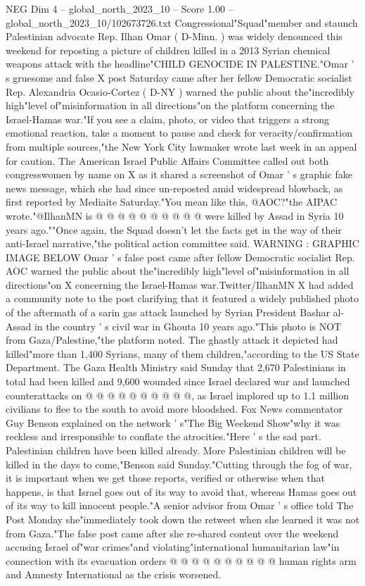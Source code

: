 \begin{textsample}{NEG Dim 4 – global\_north\_2023\_10 – Score 1.00 – global\_north\_2023\_10/102673726.txt}  \label{ex:f4_neg_012}
Congressional"Squad"member and staunch Palestinian advocate Rep.
Ilhan Omar ( D-Minn. ) was widely denounced this weekend for reposting a picture of children killed in a 2013 Syrian chemical weapons attack with the headline"CHILD GENOCIDE IN PALESTINE."Omar ' s gruesome and false X post Saturday came after her fellow Democratic socialist Rep.
Alexandria Ocasio-Cortez ( D-NY ) warned the public about the"incredibly high"level of"misinformation in all directions"on the platform concerning the Israel-Hamas war."If you see a claim, photo, or video that triggers a strong emotional reaction, take a moment to pause and check for veracity/confirmation from multiple sources,"the New York City lawmaker wrote last week in an appeal for caution.
The American Israel Public Affairs Committee called out both congresswomen by name on X as it shared a screenshot of Omar ' s graphic fake news message, which she had since un-reposted amid widespread blowback, as first reported by Mediaite Saturday."You mean like this, @AOC?"the AIPAC wrote."@IlhanMN is @ @ @ @ @ @ @ @ @ @ were killed by Assad in Syria 10 years ago.""Once again, the Squad doesn't let the facts get in the way of their anti-Israel narrative,"the political action committee said.
WARNING : GRAPHIC IMAGE BELOW Omar ' s false post came after fellow Democratic socialist Rep.
AOC warned the public about the"incredibly high"level of"misinformation in all directions"on X concerning the Israel-Hamas war.Twitter/IlhanMN X had added a community note to the post clarifying that it featured a widely published photo of the aftermath of a sarin gas attack launched by Syrian President Bashar al-Assad in the country ' s civil war in Ghouta 10 years ago."This photo is NOT from Gaza/Palestine,"the platform noted.
The ghastly attack it depicted had killed"more than 1,400 Syrians, many of them children,"according to the US State Department.
The Gaza Health Ministry said Sunday that 2,670 Palestinians in total had been killed and 9,600 wounded since Israel declared war and launched counterattacks on @ @ @ @ @ @ @ @ @ @, as Israel implored up to 1.1 million civilians to flee to the south to avoid more bloodshed.
Fox News commentator Guy Benson explained on the network ' s"The Big Weekend Show"why it was reckless and irresponsible to conflate the atrocities."Here ' s the sad part.
Palestinian children have been killed already.
More Palestinian children will be killed in the days to come,"Benson said Sunday."Cutting through the fog of war, it is important when we get those reports, verified or otherwise when that happens, is that Israel goes out of its way to avoid that, whereas Hamas goes out of its way to kill innocent people."A senior advisor from Omar ' s office told The Post Monday she"immediately took down the retweet when she learned it was not from Gaza."The false post came after she re-shared content over the weekend accusing Israel of"war crimes"and violating"international humanitarian law"in connection with its evacuation orders @ @ @ @ @ @ @ @ @ @ human rights arm and Amnesty International as the crisis worsened.

\end{textsample}
